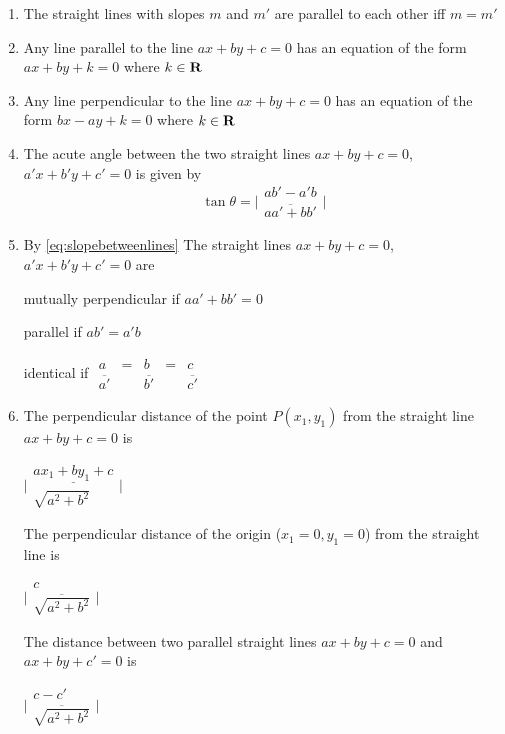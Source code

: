 \documentclass[a4paper]{article}
\begin{document}
\begin{enumerate}
\item
The straight lines with slopes $m$ and $m'$
are parallel to each other iff $m=m'$

\item
Any line parallel to the line $ax+by+c=0$ has an equation of the form 
$ax+by+k=0$ 
where $k \in \mathbf{R}$

\item
Any line perpendicular to the line $ax+by+c=0$ has an equation of the form 
$bx-ay+k=0$
where $k \in \mathbf{R}$

\item
The acute angle between the two 
straight lines $ax+by+c=0$, $a'x+b'y+c'=0$ 
is given by
\begin{equation}\label{eq:slopebetweenlines}
\tan\theta=\Big|\begin{array}{c}
ab'-a'b \\
\overline{aa'+bb'}
\end{array}\Big|
\end{equation}

\item
By \ref{eq:slopebetweenlines}
The straight lines $ax+by+c=0$, $a'x+b'y+c'=0$ are

mutually perpendicular if $aa'+bb'=0$

parallel if $ab'=a'b$

identical if $\begin{array}{ccccc}
a & = & b & = & c \\
\overline{a'} & & \overline{b'} & & \overline{c'}
\end{array}$

\item
The perpendicular distance of the point $P(x_1,y_1)$ from the straight line
$ax+by+c=0$ is

$\Big|
\begin{array}{c}
\underline{ax_1+by_1+c} \\
\sqrt{a^2+b^2}
\end{array}
\Big|$


The perpendicular distance of the origin ($x_1=0, y_1=0$) from the straight line
is

$\Big|
\begin{array}{c}
c \\
\overline{ \sqrt{a^2+b^2} }
\end{array}
\Big|$

The distance between two parallel straight lines
$ax+by+c=0$ and
$ax+by+c'=0$ is

$\Big|
\begin{array}{c}
c-c' \\
\overline{ \sqrt{a^2+b^2} }
\end{array}
\Big|$


\end{enumerate}
\end{document}
